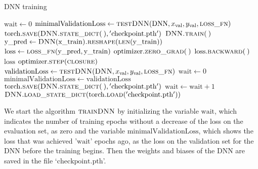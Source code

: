 \begin{algorithm}[H]%
\caption{\label{trainDNN}DNN training}
\begin{algorithmic}[1]
\State $\mathrm{wait} \gets 0$
\State $\mathrm{minimalValidationLoss} \gets \Call{testDNN}{\mathrm{DNN}, x_\mathrm{val}, y_\mathrm{val}, \textproc{loss\_fn}}$
\State $\mathrm{torch.}\Call{save}{\textproc{DNN.}\protect\Call{state\_dict}{\:}, \mathrm{'checkpoint.pth'}}$
\State\label{startTrainStep} $\textproc{DNN.}\Call{train}{\:}$
    \State $\mathrm{y\_pred} \gets \Call{DNN}{\mathrm{x\_train}}\Call{.reshape}{\protect\Call{len}{\mathrm{y\_train}}}$
    \State $\mathrm{loss} \gets \Call{loss\_fn}{\mathrm{y\_pred}, \mathrm{y\_train}}$
    \State $\mathrm{optimizer.}\Call{zero\_grad}{\:}$
    \State $\mathrm{loss.}\Call{backward}{\:}$
    \State \Return $\mathrm{loss}$
\EndFunction
\State\label{endTrainStep} $\mathrm{optimizer.}\Call{step}{\textproc{closure}}$
\State $\mathrm{validationLoss} \gets \Call{testDNN}{\textproc{DNN}, x_\mathrm{val}, y_\mathrm{val}, \textproc{loss\_fn}}$
\State $\mathrm{wait} \gets 0$
\State $\mathrm{minimalValidationLoss} \gets \mathrm{validationLoss}$
\State $\mathrm{torch.}\Call{save}{\textproc{DNN.}\protect\Call{state\_dict}{\:}, \mathrm{'checkpoint.pth'}}$
\Else
\State $\mathrm{wait} \gets \mathrm{wait}+1$
\EndIf
{}
\State $\textproc{DNN.}\Call{load\_state\_dict}{\mathrm{torch.}\protect\Call{load}{\mathrm{'checkpoint.pth'}}}$
\State \Return
\EndIf
\EndFor
\EndFunction
\end{algorithmic}
\end{algorithm}

We start the algorithm $\textproc{trainDNN}$ by initializing the variable $\mathrm{wait}$, which indicates the number of training epochs without a decrease of the loss on the evaluation set, as zero and the variable $\mathrm{minimalValidationLoss}$, which shows the loss that was achieved '$\mathrm{wait}$' epochs ago, as the loss on the validation set for the DNN before the training begins. Then the weights and biases of the DNN are saved in the file `$\mathrm{checkpoint.pth}$'.

